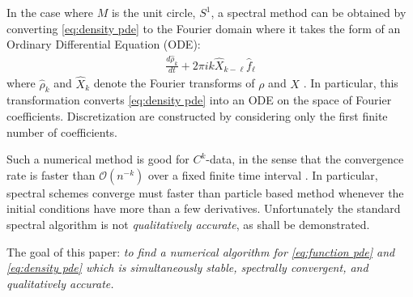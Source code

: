 \documentclass[final,leqno]{siamltex1213}
\begin{document}
In the case where $M$ is the unit circle, $S^{1}$, a spectral method can be obtained by converting \eqref{eq:density pde} to the Fourier domain where it takes the form
of an Ordinary Differential Equation (ODE):
\begin{align}
	\frac{d \hat{\rho}_{k}}{dt} + 2\pi i k  \widehat{X}_{k-\ell} \hat{f}_{\ell} \label{eq:standard spectral}
\end{align}
where $\hat{\rho}_{k}$ and $\widehat{X}_{k}$ denote the Fourier transforms of $\rho$ and $X$ \cite{Taylor1974}.
In particular, this transformation converts \eqref{eq:density pde} into an ODE on the space of Fourier coefficients.
Discretization are constructed by considering only the first finite number of coefficients. 

Such a numerical method is good for $C^{k}$-data, in the sense that the convergence rate is faster than $\mathcal{O}(n^{-k})$ over a fixed finite time interval \cite{Boyd2001,Gottlieb2001}.
In particular, spectral schemes converge must faster than particle based method whenever the initial conditions have more than a few derivatives.
Unfortunately the standard spectral algorithm is not \emph{qualitatively accurate}, as shall be demonstrated.

The goal of this paper:
\emph{to find a numerical algorithm for \eqref{eq:function pde} and \eqref{eq:density pde} which is simultaneously stable, spectrally convergent, and qualitatively accurate.}
\end{document}
